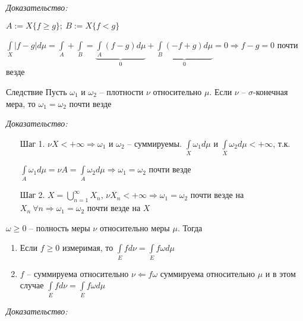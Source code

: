\documentclass[12pt]{article}
\begin{document}
\textit{Доказательство:}

$A := X\{f \geq g\};\ B := X\{f < g\}$

$\int\limits_X |f - g|d\mu = \int\limits_A + \int\limits_B = \underbrace{\int\limits_A (f - g)d\mu}_{0} + \underbrace{\int\limits_B (-f + g)d\mu}_{0} = 0 \Rightarrow f - g = 0$ почти везде

\begin{theo}{Следствие}
    Пусть $\omega_1$ и $\omega_2$ -- плотности $\nu$ относительно $\mu$. Если $\nu$ -- $\sigma$-конечная мера, то $\omega_1 = \omega_2$ почти везде
\end{theo}

\textit{Доказательство:}

\begin{itemize}
    \item[Шаг 1. ] $\nu X < + \infty \Rightarrow \omega_1$ и $\omega_2$ -- суммируемы. $\int\limits_X \omega_1 d\mu$ и $\int\limits_X \omega_2 d\mu < + \infty$, т.к. 
    
    $\int\limits_A \omega_1 d\mu = \nu A = \int\limits_A \omega_2 d\mu \Rightarrow \omega_1 = \omega_2$ почти везде

    \item[Шаг 2. ] $X = \bigcup\limits_{n = 1}^\infty X_n$, $\nu X_n < + \infty \Rightarrow \omega_1 = \omega_2$ почти везде на $X_n\ \forall n \Rightarrow \omega_1 = \omega_2$ почти везде на $X$
\end{itemize}

\begin{theo}{}
    $\omega \geq 0$ -- полность меры $\nu$ относительно меры $\mu$. Тогда 

    \begin{enumerate}
        \item Если $f \geq 0$ измеримая, то $\int\limits_E fd\nu = \int\limits_E f\omega d\mu$
        \item $f$ -- суммируема относительно $\nu \Leftarrow f\omega$ суммируема относительно $\mu$ и в этом случае $\int\limits_E fd\nu = \int\limits_E f\omega d\mu$
    \end{enumerate}
\end{theo}

\textit{Доказательство:}
\end{document}
